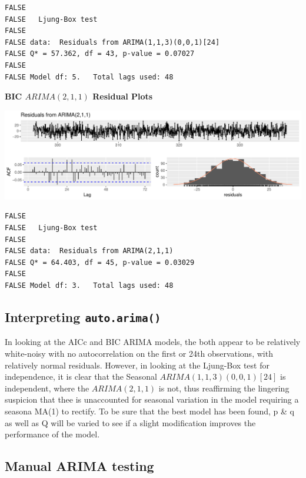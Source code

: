 \documentclass[openany]{book}
\begin{document}
\begin{verbatim}
FALSE 
FALSE   Ljung-Box test
FALSE 
FALSE data:  Residuals from ARIMA(1,1,3)(0,0,1)[24]
FALSE Q* = 57.362, df = 43, p-value = 0.07027
FALSE 
FALSE Model df: 5.   Total lags used: 48
\end{verbatim}

\textbf{BIC \(ARIMA(2,1,1)\) Residual Plots}

\includegraphics{Group2_Project1_Fall2019_files/figure-latex/unnamed-chunk-23-1.pdf}

\begin{verbatim}
FALSE 
FALSE   Ljung-Box test
FALSE 
FALSE data:  Residuals from ARIMA(2,1,1)
FALSE Q* = 64.403, df = 45, p-value = 0.03029
FALSE 
FALSE Model df: 3.   Total lags used: 48
\end{verbatim}

\hypertarget{interpreting-auto.arima}{%
\subsection{\texorpdfstring{Interpreting
\texttt{auto.arima()}}{Interpreting auto.arima()}}\label{interpreting-auto.arima}}

In looking at the AICc and BIC ARIMA models, the both appear to be
relatively white-noisy with no autocorrelation on the first or 24th
observations, with relatively normal residuals. However, in looking at
the Ljung-Box test for independence, it is clear that the Seasonal
\(ARIMA (1,1,3)(0,0,1)[24]\) is independent, where the \(ARIMA(2,1,1)\)
is not, thus reaffirming the lingering suspicion that thee is
unaccounted for seasonal variation in the model requiring a seasona
MA(1) to rectify. To be sure that the best model has been found, p \& q
as well as Q will be varied to see if a slight modification improves the
performance of the model.

\hypertarget{manual-arima-testing}{%
\subsection{Manual ARIMA testing}\label{manual-arima-testing}}
\end{document}
